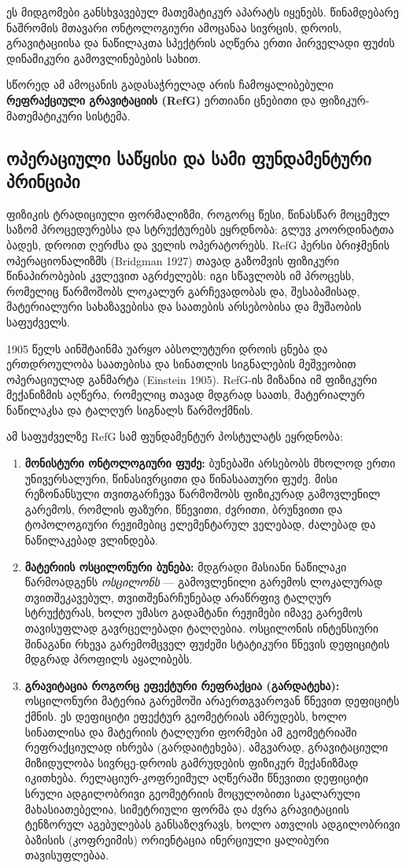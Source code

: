 \documentclass[11pt,a4paper]{article}
\begin{document}
ეს მიდგომები განსხვავებულ მათემატიკურ აპარატს იყენებს. წინამდებარე ნაშრომის მთავარი ონტოლოგიური ამოცანაა სივრცის, დროის, გრავიტაციისა და ნაწილაკთა სპექტრის აღწერა ერთი პირველადი ფუძის დინამიკური გამოვლინებების სახით.

სწორედ ამ ამოცანის გადასაჭრელად არის ჩამოყალიბებული \textbf{რეფრაქციული გრავიტაციის (RefG)} ერთიანი ცნებითი და ფიზიკურ-მათემატიკური სისტემა.

\subsection*{ოპერაციული საწყისი და სამი ფუნდამენტური პრინციპი}

ფიზიკის ტრადიციული ფორმალიზმი, როგორც წესი, წინასწარ მოცემულ საზომ პროცედურებსა და სტრუქტურებს ეყრდნობა: გლუვ კოორდინატთა ბადეს, დროით ღერძსა და ველის ოპერატორებს. RefG პერსი ბრიჯმენის ოპერაციონალიზმს (Bridgman 1927) თავად გაზომვის ფიზიკური წინაპირობების კვლევით აგრძელებს: იგი სწავლობს იმ პროცესს, რომელიც წარმოშობს ლოკალურ გარჩევადობას და, შესაბამისად, მატერიალური სახაზავებისა და საათების არსებობისა და მუშაობის საფუძველს.

1905 წელს აინშტაინმა უარყო აბსოლუტური დროის ცნება და ერთდროულობა საათებისა და სინათლის სიგნალების მეშვეობით ოპერაციულად განმარტა (Einstein 1905). RefG-ის მიზანია იმ ფიზიკური მექანიზმის აღწერა, რომელიც თავად მდგრად საათს, მატერიალურ ნაწილაკსა და ტალღურ სიგნალს წარმოქმნის.

ამ საფუძველზე RefG სამ ფუნდამენტურ პოსტულატს ეყრდნობა:

\begin{enumerate}[label=\arabic*.]
\item \textbf{მონისტური ონტოლოგიური ფუძე:} ბუნებაში არსებობს მხოლოდ ერთი უნივერსალური, წინასივრცითი და წინასაათური ფუძე. მისი რეზონანსული თვითგარჩევა წარმოშობს ფიზიკურად გამოვლენილ გარემოს, რომლის ფაზური, წნევითი, ძვრითი, ბრუნვითი და ტოპოლოგიური რეჟიმებიც ელემენტარულ ველებად, ძალებად და ნაწილაკებად ვლინდება.
\item \textbf{მატერიის ოსცილონური ბუნება:} მდგრადი მასიანი ნაწილაკი წარმოადგენს \emph{ოსცილონს} — გამოვლენილი გარემოს ლოკალურად თვითშეკავებულ, თვითშენარჩუნებად არაწრფივ ტალღურ სტრუქტურას, ხოლო უმასო გადამტანი რეჟიმები იმავე გარემოს თავისუფლად გავრცელებადი ტალღებია. ოსცილონის ინტენსიური შინაგანი რხევა გარემომცველ ფუძეში სტატიკური წნევის დეფიციტის მდგრად პროფილს აყალიბებს.
\item \textbf{გრავიტაცია როგორც ეფექტური რეფრაქცია (გარდატეხა):} ოსცილონური მატერია გარემოში არაერთგვაროვან წნევით დეფიციტს ქმნის. ეს დეფიციტი ეფექტურ გეომეტრიას ამრუდებს, ხოლო სინათლისა და მატერიის ტალღური ფორმები ამ გეომეტრიაში რეფრაქციულად იხრება (გარდაიტეხება). ამგვარად, გრავიტაციული მიზიდულობა სივრცე-დროის გამრუდების ფიზიკურ მექანიზმად იკითხება. რელაციურ-კოფრეიმულ აღწერაში წნევითი დეფიციტი სრული ადგილობრივი გეომეტრიის მოცულობითი სკალარული მახასიათებელია, სიმეტრიული ფორმა და ძვრა გრავიტაციის ტენზორულ აგებულებას განსაზღვრავს, ხოლო ათვლის ადგილობრივი ბაზისის (კოფრეიმის) ორიენტაცია ინერციული ყალიბური თავისუფლებაა.

\end{enumerate}
\end{document}
